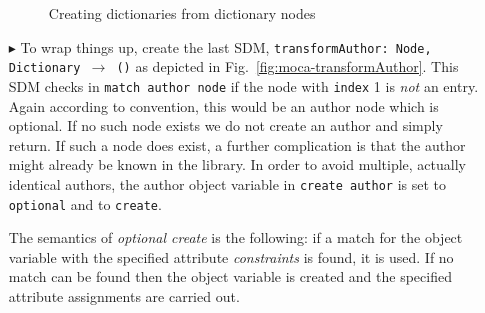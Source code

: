 \begin{enumerate}
\begin{figure}[!htbp]
\begin{center}
  \caption{Creating dictionaries from dictionary nodes} 
  \label{fig:moca-transformNode}
\end{center}
\end{figure}
\clearpage
\item[$\blacktriangleright$] To wrap things up, create the last SDM, \texttt{transformAuthor:~Node, Dictionary $\rightarrow$ ()} as depicted in Fig.~\ref{fig:moca-transformAuthor}.
This SDM checks in \texttt{match author node} if the node with \texttt{index} 1 is \emph{not} an entry.
Again according to convention, this would be an author node which is optional.
If no such node exists we do not create an author and simply return.
If such a node does exist, a further complication is that the author might already be known in the library.
In order to avoid multiple, actually identical authors, the author object variable in \texttt{create author} is set to \texttt{optional} and to \texttt{create}.

The semantics of \emph{optional create} is the following:  if a match for the object variable with the specified attribute \emph{constraints} is found, it is used.
If no match can be found then the object variable is created and the specified attribute assignments are carried out.


\end{enumerate}
